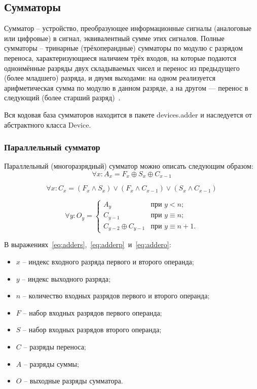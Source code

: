 \documentclass[document.tex]{subfiles}
\begin{document}
\clearpage

\subsection{Сумматоры}
Сумматор -- устройство, преобразующее информационные сигналы (аналоговые или
цифровые) в сигнал, эквивалентный сумме этих сигналов. Полные сумматоры --
тринарные (трёхоперандные) сумматоры по модулю с разрядом переноса,
характеризующиеся наличием трёх входов, на которые подаются одноимённые разряды
двух складываемых чисел и перенос из предыдущего (более младшего) разряда, и
двумя выходами: на одном реализуется арифметическая сумма по модулю в данном
разряде, а на другом — перенос в следующий (более старший
разряд)~\cite{wikiadder}.

Вся кодовая база сумматоров находится в пакете devices.adder и наследуется от
абстрактного класса Device.

\clearpage
\subsubsection{Параллельный сумматор}

Параллельный (многоразрядный) сумматор можно описать следующим образом:
\begin{equation}
\label{eq:adders}
\forall x: A_x = F_x \oplus S_x \oplus C_{x - 1} 
\end{equation}

\begin{equation}
\label{eq:adderp}
\forall x: C_x = (F_x \wedge S_x) \vee (F_x \wedge C_{x - 1}) \vee (S_x \wedge
C_{x - 1}) 
\end{equation}

\begin{equation}
\label{eq:addero}
\forall y: O_y = \begin{cases}
A_y &\mbox{при } y < n; \\
C_{y - 1} &\mbox{при } y \equiv n; \\
C_{y - 2} \oplus C_{y - 1} &\mbox{при } y \equiv n + 1.
\end{cases} 
\end{equation}

В выражениях~\ref{eq:adders},~\ref{eq:adderp}~и~\ref{eq:addero}:
\begin{itemize}[noitemsep]
  \item $x$ -- индекс входного разряда первого и второго операнда;
  \item $y$ -- индекс выходного разряда;
  \item $n$ -- количество входных разрядов первого и второго операнда;
  \item $F$ -- набор входных разрядов первого операнда;
  \item $S$ -- набор входных разрядов второго операнда;
  \item $C$ -- разряды переноса;
  \item $A$ -- разряды суммы;
  \item $O$ -- выходные разряды сумматора.
\end{itemize}
\end{document}
